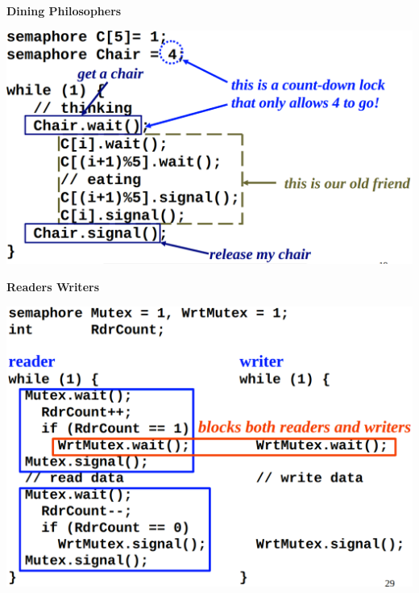 \documentclass[a4paper, 12pt]{article}
\begin{document}
\begin{multicols*}{3}
\medskip

\textbf{Dining Philosophers}
\begin{center}
    \includegraphics[scale=0.19]{philosophers-countdown.png}
\end{center}

\medskip

\textbf{Readers Writers}
\begin{center}
    \includegraphics[scale=0.19]{readers-writers.png}
\end{center}

\end{multicols*}
\end{document}
